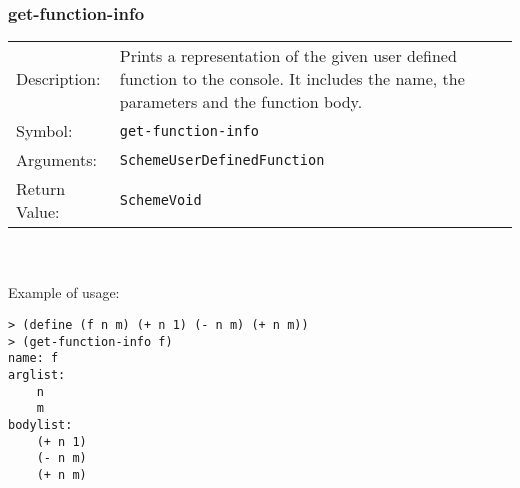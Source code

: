 \documentclass[12pt,a4paper]{scrartcl}
\begin{document}
\subsubsection*{get-function-info}
\begin{tabular}{l  p{13cm}}
Description: & Prints a representation of the given user defined function to the console. It includes the name, the parameters and the function body.\\
Symbol: & \lstinline{get-function-info}\\
Arguments: & \lstinline{SchemeUserDefinedFunction}\\
Return Value: & \lstinline{SchemeVoid}
\end{tabular}
\\
\\
Example of usage:
\begin{lstlisting}
> (define (f n m) (+ n 1) (- n m) (+ n m))
> (get-function-info f)
name: f
arglist:
	n
	m
bodylist:
	(+ n 1)
	(- n m)
	(+ n m)
\end{lstlisting}
\end{document}

